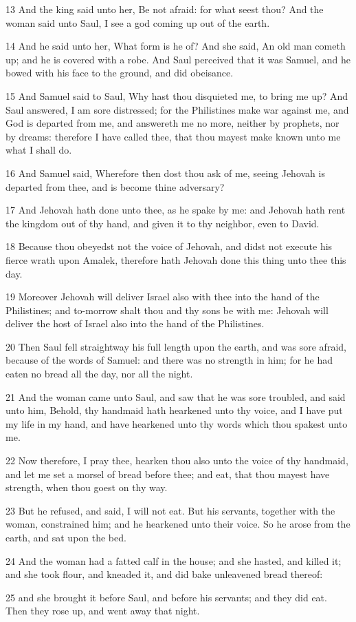\par 13 And the king said unto her, Be not afraid: for what seest thou? And the woman said unto Saul, I see a god coming up out of the earth.
\par 14 And he said unto her, What form is he of? And she said, An old man cometh up; and he is covered with a robe. And Saul perceived that it was Samuel, and he bowed with his face to the ground, and did obeisance.
\par 15 And Samuel said to Saul, Why hast thou disquieted me, to bring me up? And Saul answered, I am sore distressed; for the Philistines make war against me, and God is departed from me, and answereth me no more, neither by prophets, nor by dreams: therefore I have called thee, that thou mayest make known unto me what I shall do.
\par 16 And Samuel said, Wherefore then dost thou ask of me, seeing Jehovah is departed from thee, and is become thine adversary?
\par 17 And Jehovah hath done unto thee, as he spake by me: and Jehovah hath rent the kingdom out of thy hand, and given it to thy neighbor, even to David.
\par 18 Because thou obeyedst not the voice of Jehovah, and didst not execute his fierce wrath upon Amalek, therefore hath Jehovah done this thing unto thee this day.
\par 19 Moreover Jehovah will deliver Israel also with thee into the hand of the Philistines; and to-morrow shalt thou and thy sons be with me: Jehovah will deliver the host of Israel also into the hand of the Philistines.
\par 20 Then Saul fell straightway his full length upon the earth, and was sore afraid, because of the words of Samuel: and there was no strength in him; for he had eaten no bread all the day, nor all the night.
\par 21 And the woman came unto Saul, and saw that he was sore troubled, and said unto him, Behold, thy handmaid hath hearkened unto thy voice, and I have put my life in my hand, and have hearkened unto thy words which thou spakest unto me.
\par 22 Now therefore, I pray thee, hearken thou also unto the voice of thy handmaid, and let me set a morsel of bread before thee; and eat, that thou mayest have strength, when thou goest on thy way.
\par 23 But he refused, and said, I will not eat. But his servants, together with the woman, constrained him; and he hearkened unto their voice. So he arose from the earth, and sat upon the bed.
\par 24 And the woman had a fatted calf in the house; and she hasted, and killed it; and she took flour, and kneaded it, and did bake unleavened bread thereof:
\par 25 and she brought it before Saul, and before his servants; and they did eat. Then they rose up, and went away that night.

